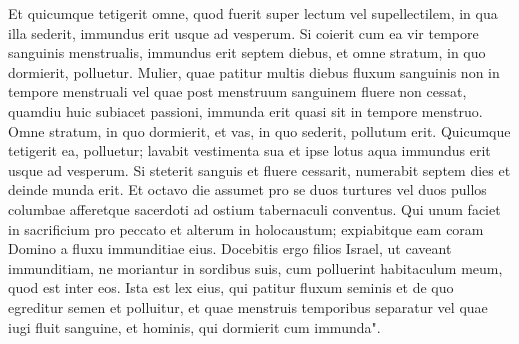 \begin{biblechapter}
\verse Et quicumque tetigerit omne, quod fuerit super lectum vel supellectilem, in qua illa sederit, immundus erit usque ad vesperum. 
\verse Si coierit cum ea vir tempore sanguinis menstrualis, immundus erit septem diebus, et omne stratum, in quo dormierit, polluetur. 
\verse Mulier, quae patitur multis diebus fluxum sanguinis non in tempore menstruali vel quae post menstruum sanguinem fluere non cessat, quamdiu huic subiacet passioni, immunda erit quasi sit in tempore menstruo. 
\verse Omne stratum, in quo dormierit, et vas, in quo sederit, pollutum erit. 
\verse Quicumque tetigerit ea, polluetur; lavabit vestimenta sua et ipse lotus aqua immundus erit usque ad vesperum. 
\verse Si steterit sanguis et fluere cessarit, numerabit septem dies et deinde munda erit. 
\verse Et octavo die assumet pro se duos turtures vel duos pullos columbae afferetque sacerdoti ad ostium tabernaculi conventus. 
\verse Qui unum faciet in sacrificium pro peccato et alterum in holocaustum; expiabitque eam coram Domino a fluxu immunditiae eius. 
\verse Docebitis ergo filios Israel, ut caveant immunditiam, ne moriantur in sordibus suis, cum polluerint habitaculum meum, quod est inter eos. 
\verse Ista est lex eius, qui patitur fluxum seminis et de quo egreditur semen et polluitur,  
\verse et quae menstruis temporibus separatur vel quae iugi fluit sanguine, et hominis, qui dormierit cum immunda". 
\end{biblechapter}

